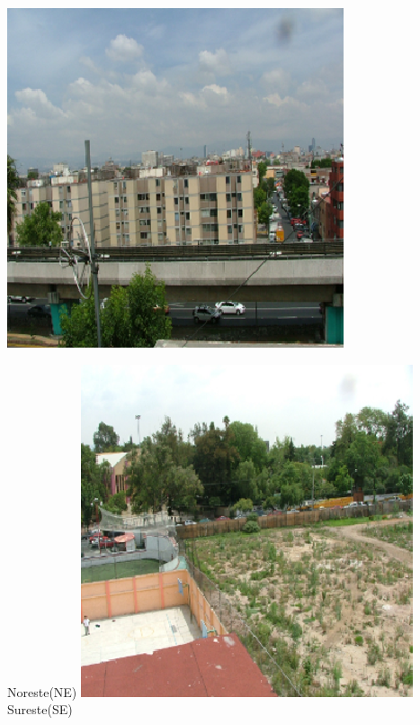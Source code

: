 \documentclass{article}
\begin{document}
\begin{minipage}{0.53\linewidth}
\begin{minipage}{0.23\linewidth}
\includegraphics[scale=0.68]{images/suroeste.eps}
\end{minipage}
\begin{minipage}{0.23\linewidth}
\colorbox{ner}{\changefontsizes{9pt} \hspace{0.4cm} Noreste(NE) \hspace{0.4cm}}
\includegraphics[scale=0.68]{images/noreste.eps}\\
\colorbox{ner}{\changefontsizes{9pt} \hspace{0.5cm} Sureste(SE)   \hspace{0.5cm}}

\end{minipage}
\end{minipage}
\end{document}
